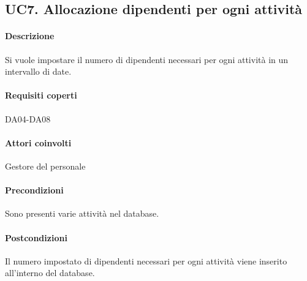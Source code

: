 \subsection{UC7. Allocazione dipendenti per ogni attività}
\paragraph{Descrizione}
Si vuole impostare il numero di dipendenti necessari per ogni attività in un intervallo di date.
\paragraph{Requisiti coperti}
DA04-DA08
\paragraph{Attori coinvolti}
Gestore del personale
\paragraph{Precondizioni}
Sono presenti varie attività nel database.
\paragraph{Postcondizioni}
Il numero impostato di dipendenti necessari per ogni attività viene inserito all’interno del database.
